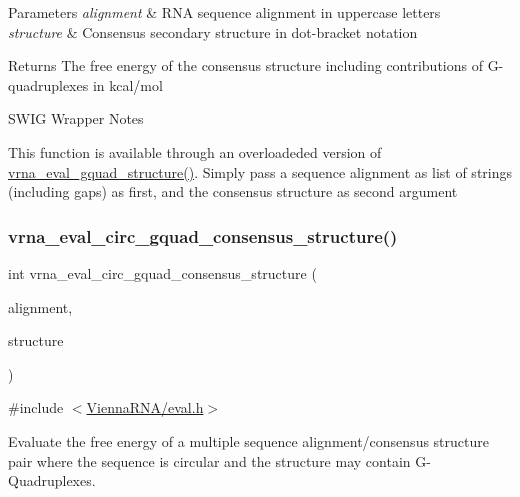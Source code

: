 \begin{DoxyParams}{Parameters}
{\em alignment} & R\+NA sequence alignment in uppercase letters \\
\hline
{\em structure} & Consensus secondary structure in dot-\/bracket notation \\
\hline
\end{DoxyParams}
\begin{DoxyReturn}{Returns}
The free energy of the consensus structure including contributions of G-\/quadruplexes in kcal/mol
\end{DoxyReturn}
\begin{DoxyRefDesc}{S\+W\+I\+G Wrapper Notes}
\item[\hyperlink{wrappers__wrappers000041}{S\+W\+I\+G Wrapper Notes}]This function is available through an overloadeded version of \hyperlink{group__eval_ga3263504825ef4b523eba797c99921df4}{vrna\+\_\+eval\+\_\+gquad\+\_\+structure()}. Simply pass a sequence alignment as list of strings (including gaps) as first, and the consensus structure as second argument \end{DoxyRefDesc}
\mbox{\label{group__eval_gac673ebb9ae2a29f54d201e2ac5b85540}} 
\subsubsection{\texorpdfstring{vrna\+\_\+eval\+\_\+circ\+\_\+gquad\+\_\+consensus\+\_\+structure()}{vrna\_eval\_circ\_gquad\_consensus\_structure()}}
{\footnotesize\ttfamily int vrna\+\_\+eval\+\_\+circ\+\_\+gquad\+\_\+consensus\+\_\+structure (\begin{DoxyParamCaption}\item[{const char $\ast$$\ast$}]{alignment,  }\item[{const char $\ast$}]{structure }\end{DoxyParamCaption})}



{\ttfamily \#include $<$\hyperlink{eval_8h}{Vienna\+R\+N\+A/eval.\+h}$>$}



Evaluate the free energy of a multiple sequence alignment/consensus structure pair where the sequence is circular and the structure may contain G-\/\+Quadruplexes. 

